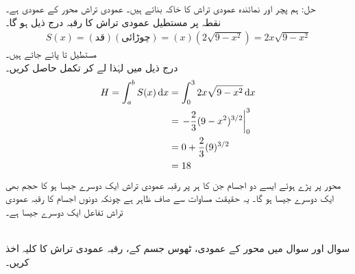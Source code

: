 حل:\quad
{} \quad {}\quad
ہم پچر اور نمائندہ عمودی تراش کا خاکہ بناتے ہیں۔ عمودی تراش  محور کے عمودی ہے۔\\
\quad {}
\quad
نقطہ  پر مستطیل عمودی تراش کا رقبہ درج ذیل ہو گا۔
\begin{align*}
S(x)=(\text{قد})(\text{چوڑائی})=(x)(2\sqrt{9-x^2})=2x\sqrt{9-x^2}
\end{align*}
\quad
{}\quad
مستطیل  تا  پائے جاتے ہیں۔\\
\quad {}
درج ذیل میں  لہٰذا  لے کر تکمل حاصل کریں۔
\begin{align*}
H=\int_a^bS(x)\dif x&=\int_0^32x\sqrt{9-x^2}\dif x\\
&=\left.-\frac{2}{3}(9-x^2)^{3/2}\right\vert_0^3\\
&=0+\frac{2}{3}(9)^{3/2}\\
&=18
\end{align*}
محور  پر پڑے ہوئے ایسے دو اجسام جن کا ہر  پر رقبہ عمودی تراش ایک دوسرے جیسا ہو کا حجم بھی ایک دوسرے جیسا ہو گا۔ یہ حقیقت  مساوات  سے صاف ظاہر ہے چونکہ دونوں اجسام کا رقبہ عمودی تراش تفاعل  ایک دوسرے جیسا ہے۔

\\
سوال  اور سوال  میں  محور کے عمودی، ٹھوس جسم کے، رقبہ عمودی تراش  کا کلیہ اخذ کریں۔ 

